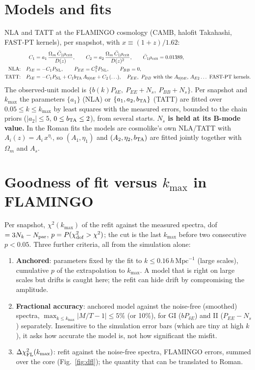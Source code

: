 \documentclass[11pt]{article}
\newcommand{\hmpc}{\,h\,\mathrm{Mpc}^{-1}}
\newcommand{\dchi}{\Delta\chi^2}
\begin{document}
\section{Models and fits}
NLA and TATT at the FLAMINGO cosmology (CAMB, halofit Takahashi, FAST-PT kernels), per snapshot, with $x\equiv(1+z)/1.62$:
\begin{align}
C_1 &= a_1\,\frac{\Omega_m\,\bar C_1\rho_{\rm crit}}{D(z)},\qquad C_2 = a_2\,\frac{\Omega_m\,\bar C_1\rho_{\rm crit}}{D(z)^2},\qquad \bar C_1\rho_{\rm crit}=0.01389,\\
\text{NLA:}\quad P_{\delta E}&=-C_1P_{\rm NL},\qquad P_{EE}=C_1^2P_{\rm NL},\qquad P_{BB}=0,\\
\text{TATT:}\quad P_{\delta E}&=-C_1P_{\rm NL}+C_1 b_{\rm TA}\,A_{0|0E}+C_2\,(\ldots),\quad P_{EE},\ P_{BB}\ \text{with the } A_{0|0E},\,A_{E2}\ldots\ \text{FAST-PT kernels.}
\end{align}
The observed-unit model is $\{b(k)P_{\delta E},\ P_{EE}+N_s,\ P_{BB}+N_s\}$. Per snapshot and $k_{\max}$ the parameters $\{a_1\}$ (NLA) or $\{a_1,a_2,b_{\rm TA}\}$ (TATT) are fitted over $0.05\le k\le k_{\max}$ by least squares with the measured errors, bounded to the chain priors ($|a_2|\le5$, $0\le b_{\rm TA}\le2$), from several starts. \textbf{$N_s$ is held at its B-mode value.} In the Roman fits the models are cosmolike's own NLA/TATT with $A_i(z)=A_i\,x^{\eta_i}$, so $(A_1,\eta_1)$ and $(A_2,\eta_2,b_{\rm TA})$ are fitted jointly together with $\Omega_m$ and $A_s$.

\section{Goodness of fit versus $k_{\max}$ in FLAMINGO}\label{sec:gof}
Per snapshot, $\chi^2(k_{\max})$ of the refit against the measured spectra, dof $=3N_k-N_{\rm par}$, $p=P(\chi^2_{\rm dof}>\chi^2)$; the cut is the last $k_{\max}$ before two consecutive $p<0.05$. Three further criteria, all from the simulation alone:
\begin{enumerate}
\item \textbf{Anchored}: parameters fixed by the fit to $k\le0.16\hmpc$ (large scales), cumulative $p$ of the extrapolation to $k_{\max}$. A model that is right on large scales but drifts is caught here; the refit can hide drift by compromising the amplitude.
\item \textbf{Fractional accuracy}: anchored model against the noise-free (smoothed) spectra, $\max_{k\le k_{\max}}|M/T-1|\le 5\%$ (or 10\%), for GI ($bP_{\delta E}$) and II ($P_{EE}-N_s$) separately. Insensitive to the simulation error bars (which are tiny at high $k$), it asks how accurate the model is, not how significant the misfit.
\item $\dchi_{\rm FL}(k_{\max})$: refit against the noise-free spectra, FLAMINGO errors, summed over the core (Fig.~\ref{fig:dfl}); the quantity that can be translated to Roman.
\end{enumerate}
\end{document}

